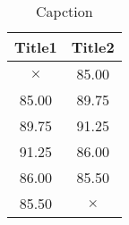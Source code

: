 \begin{table}[b]
    \centering
    \begin{tabu}{cc} \toprule
           Title1 &   Title2 \\ \midrule
         $\times$ &    85.00 \\
            85.00 &    89.75 \\
            89.75 &    91.25 \\
            91.25 &    86.00 \\
            86.00 &    85.50 \\
            85.50 & $\times$ \\ \bottomrule
    \end{tabu}
    \caption{Capction}
    \label{tab:table}
\end{table}

